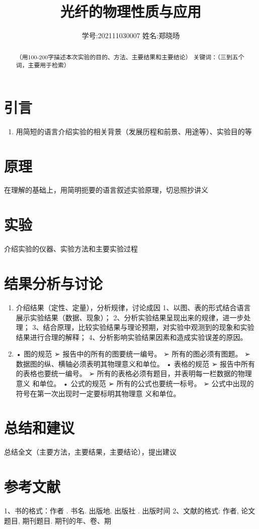 \documentclass[12pt,a4paper]{article}
\title{\vspace{-4cm}\Large 光纤的物理性质与应用}  %
\author{\kaishu 学号:202111030007 \hspace{2cm} 姓名:郑晓旸}   %
\date{}
\begin{document}
\maketitle

\begin{abstract}
    （用100-200字描述本次实验的目的、方法、主要结果和主要结论） 
    关键词：（三到五个词，主要用于检索）
\end{abstract}

\section{引言}

\begin{enumerate}
\item 用简短的语言介绍实验的相关背景（发展历程和前景、用途等）、实验目的等
\end{enumerate}

\section{原理}
在理解的基础上，用简明扼要的语言叙述实验原理，切忌照抄讲义
\section{实验}
介绍实验的仪器、实验方法和主要实验过程
\section{结果分析与讨论}
\begin{enumerate}
    \item 介绍结果（定性、定量），分析规律，讨论成因
    1、以图、表的形式结合语言展示实验结果（数据、现象）；
    2、分析实验结果呈现出来的规律，进一步处理；
    3、结合原理，比较实验结果与理论预期，对实验中观测到的现象和实验结果进行合理的解释；
    4、分析影响实验结果因素和造成实验误差的原因。
    \item • 图的规范
    ➢ 报告中的所有的图要统一编号。
    ➢ 所有的图必须有图题。
    ➢ 数据图的纵、横轴必须表明其物理意义和单位。
    • 表格的规范
    ➢ 报告中所有的表格也要统一编号。
    ➢ 所有的表格必须有题目，并表明每一栏数据的物理意义
    和单位。
    • 公式的规范
    ➢ 所有的公式也要统一标号。
    ➢ 公式中出现的符号在第一次出现时一定要标明其物理意
    义和单位。
\end{enumerate}
\section{总结和建议}
总结全文（主要方法，主要结果，主要结论），提出建议
\section{参考文献}
1、书的格式：作者 . 书名. 出版地. 出版社 . 出版时间
2、文献的格式: 作者, 论文题目, 期刊题目. 期刊的年、卷、期
\end{document}
